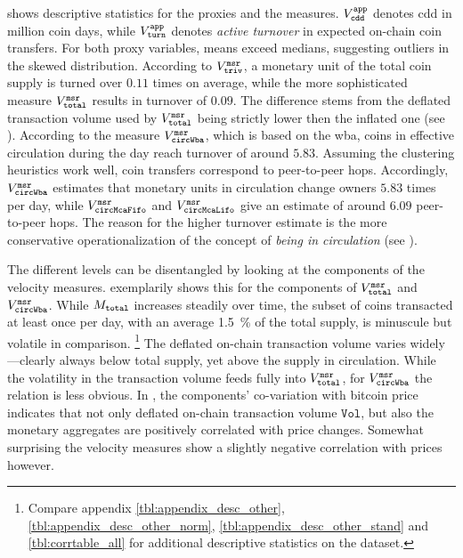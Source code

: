  shows descriptive statistics for the
proxies and the measures.  %
${V^{{\mathtt{app}}}_{\mathtt{cdd}}}$ denotes \ac{cdd} in million coin days, while ${V^{{\mathtt{app}}}_{\mathtt{turn}}}$ denotes
\emph{active turnover} in expected on-chain coin transfers.  %
For both proxy variables, means exceed medians, suggesting outliers in the
skewed distribution.  %
% 
According to ${V_{\mathtt{triv}}^{\mathtt{msr}}}$, a monetary unit of the total coin supply is turned
over $0.11$ times on average, while the more sophisticated measure
${V_{\mathtt{total}}^{\mathtt{msr}}}$ results in turnover of $0.09$.  %
The difference stems from the deflated transaction volume used by
${V_{\mathtt{total}}^{\mathtt{msr}}}$ being strictly lower then the inflated one (see
).  %
According to the measure ${V_{\mathtt{circWba}}^{\mathtt{msr}}}$, which is based on the \ac{wba}, coins
in effective circulation during the day reach turnover of around $5.83$.  %
Assuming the clustering heuristics work well, coin transfers correspond to
peer-to-peer hops.  %
Accordingly, ${V_{\mathtt{circWba}}^{\mathtt{msr}}}$ estimates that monetary units in circulation
change owners $5.83$ times per day, while ${V_{\mathtt{circMcaFifo}}^{\mathtt{msr}}}$ and ${V_{\mathtt{circMcaLifo}}^{\mathtt{msr}}}$ give
an estimate of around $6.09$ peer-to-peer hops.  %
The reason for the higher turnover estimate is the more conservative
operationalization of the concept of \textit{being in circulation} (see
).  %

The different levels can be disentangled by looking at the components of the
velocity measures.  %
 exemplarily shows this for the components of
${V_{\mathtt{total}}^{\mathtt{msr}}}$ and ${V_{\mathtt{circWba}}^{\mathtt{msr}}}$.  %
While ${M_{\mathtt{total}}}$ increases steadily over time, the subset of coins transacted
at least once per day, with an average \SI{1.5}{\percent} of the total
supply, is minuscule but volatile in comparison.%
\footnote{Compare appendix \ref{tbl:appendix_desc_other},
  \ref{tbl:appendix_desc_other_norm}, \ref{tbl:appendix_desc_other_stand} and
  \ref{tbl:corrtable_all} for additional descriptive statistics on the
  dataset.}  %
The deflated on-chain transaction volume varies widely---clearly always below
total supply, yet above the supply in circulation.  %
While the volatility in the transaction volume feeds fully into ${V_{\mathtt{total}}^{\mathtt{msr}}}$,
for ${V_{\mathtt{circWba}}^{\mathtt{msr}}}$ the relation is less obvious.  %
In , the components' co-variation with bitcoin
price indicates that not only deflated on-chain transaction volume
$\mathtt{Vol}$, but also the monetary aggregates are positively correlated
with price changes.  %
Somewhat surprising the velocity measures show a slightly negative correlation
with prices however. %
% 
\renewcommand{\captionGlo}{Components of velocity measures
  $\protect\VTotalEst$ and $\protect\VCircWbEst$ with
  $\perd = \wndwLength = 1 \ttext{ day} $.}%

